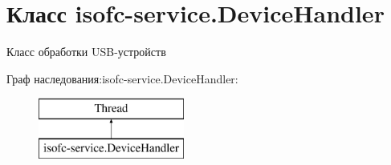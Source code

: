 \hypertarget{classisofc-service_1_1DeviceHandler}{}\section{Класс isofc-\/service.Device\+Handler}
\label{classisofc-service_1_1DeviceHandler}


Класс обработки U\+S\+B-\/устройств  


Граф наследования\+:isofc-\/service.Device\+Handler\+:\begin{figure}[H]
\begin{center}
\leavevmode
\includegraphics[height=2.000000cm]{classisofc-service_1_1DeviceHandler}
\end{center}
\end{figure}
